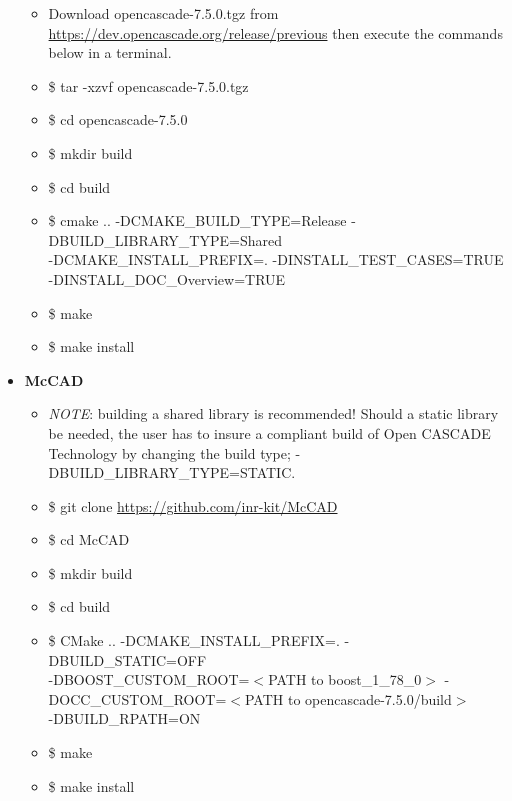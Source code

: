 \documentclass[letterpaper, 10 pt]{report}
\begin{document}
\begin{itemize}
\begin{itemize}
    	\item Download opencascade-7.5.0.tgz from \url{https://dev.opencascade.org/release/previous} then execute the commands below in a terminal.
    	\item \$ tar -xzvf opencascade-7.5.0.tgz
    	\item \$ cd opencascade-7.5.0
    	\item \$ mkdir build
    	\item \$ cd build
    	\item \$ cmake .. -DCMAKE\_BUILD\_TYPE=Release -DBUILD\_LIBRARY\_TYPE=Shared \\ -DCMAKE\_INSTALL\_PREFIX=. -DINSTALL\_TEST\_CASES=TRUE \\ -DINSTALL\_DOC\_Overview=TRUE
    	\item \$ make
    	\item \$ make install
    \end{itemize}
	\item \textbf{McCAD}
	\begin{itemize}
		\item \emph{NOTE}: building a shared library is recommended! Should a static library be needed, the user has to insure a compliant build of Open CASCADE Technology by changing the build type; -DBUILD\_LIBRARY\_TYPE=STATIC.
		\item \$ git clone \url{https://github.com/inr-kit/McCAD}
		\item \$ cd McCAD
		\item \$ mkdir build
		\item \$ cd build
		\item \$ CMake .. -DCMAKE\_INSTALL\_PREFIX=. -DBUILD\_STATIC=OFF \\ -DBOOST\_CUSTOM\_ROOT=$<$PATH to boost\_1\_78\_0$>$ -DOCC\_CUSTOM\_ROOT=$<$PATH to opencascade-7.5.0/build$>$ \\ -DBUILD\_RPATH=ON
		\item \$ make
		\item \$ make install
	\end{itemize}
  \end{itemize}
\end{document}
